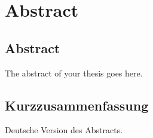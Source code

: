 \chapter{Abstract}

\section{Abstract}
The abstract of your thesis goes here.

\lipsum[1-6]

\section{Kurzzusammenfassung}

Deutsche Version des Abstracts.

\lipsum[1-6]